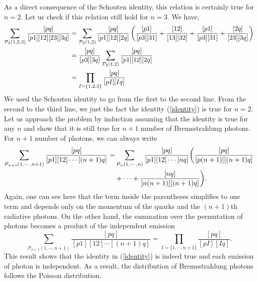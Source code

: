 As a direct consequence of the Schouten identity, this relation is certainly true for $n=2$. Let us check if this relation still hold for $n=3$. We have,
\begin{align}
\sum_{\mathcal{P}_{3}(1,2,3)} \frac{[pq]}{[p1] [12] [23] [3q]} &= \sum_{\mathcal{P}_{2}(1,2)} \frac{[pq]}{[p1] [12] [2q]} \left( \frac{[p 1]}{[p 3] [3 1]}+\frac{[1 2]}{[1 3] [3 2]}+\frac{[p 1]}{[p 3] [3 1]}+\frac{[2 q]}{[2 3] [3 q]} \right) \nonumber \\
&= \frac{[p q]}{[p 3] [3 q]} \sum_{\mathcal{P}_{2}(1,2)} \frac{[pq]}{[p1] [12] [2q]} \\
&=\prod_{I=\{1,2,3\}} \frac{[pq]}{[pI] [Iq]}
\end{align}
We used the Schouten identity to go from the first to the second line. From the second to the third line, we just the fact the identity (\ref{identity}) is true for $n=2$. Let us approach the problem by induction assuming that the identity is true for any $n$ and show that it is still true for $n+1$ number of Bremsstrahlung photons. For $n+1$ number of photons, we can always write 
\begin{align}
\sum_{\mathcal{P}_{n+1}(1,\cdots , n+1)} \frac{[pq]}{[p1] [12] \cdots [(n+1)q]}= & \sum_{\mathcal{P}_{n}(1,\cdots , n)} \frac{[pq]}{[p1] [12] \cdots [nq]} \bigg( \frac{[p q]}{[p (n+1)] [(n+1) q]} \nonumber \\ 
& +\cdots + \frac{[n q]}{[n (n+1)] [(n+1) q]} \bigg).
\end{align}
Again, one can see here that the term inside the parentheses simplifies to one term and depends only on the momentum of the quarks and the $(n+1)$th radiative photons. On the other hand, the summation over the permutation of photons becomes a product of the independent emission
\begin{equation}
\sum_{\mathcal{P}_{n+1}(1,\cdots , n+1)} \frac{[pq]}{[p1] [12] \cdots [(n+1)q]}=\prod_{I=\{1, \cdots , n+1\}} \frac{[pq]}{[pI] [Iq]}.
\end{equation}
This result shows that the identity in (\ref{identity}) is indeed true and each emission of photon is independent. As a result, the distribution of Bremsstrahlung photons follows the Poisson distribution. 

